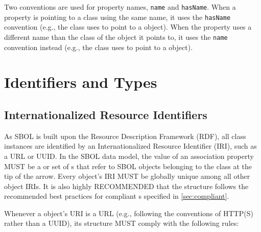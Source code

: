 Two conventions are used for property names, {\tt name} and {\tt hasName}.
When a property is pointing to a class using the same name, it uses the {\tt hasName} convention (e.g., the  class uses  to point to a  object).
When the property uses a different name than the class of the object it points to, it uses the {\tt name} convention instead (e.g., the  class uses  to point to a  object).


\section{Identifiers and Types}

\subsection{Internationalized Resource Identifiers}
\label{sec:IRIstructure}
\label{sec:identity}

As SBOL is built upon the Resource Description Framework (RDF), all class instances are identified by an Internationalized Resource Identifier (IRI), such as a URL or UUID.  
In the SBOL data model, the value of an association property MUST be a  or set of s that refer to SBOL objects belonging to the class at the tip of the arrow.  Every  object's IRI MUST be globally unique among all other  object IRIs. It is also highly RECOMMENDED that the  structure follows the recommended best practices for compliant s specified in \ref{sec:compliant}.

Whenever a  object's URI is a URL (e.g., following the conventions of HTTP(S) rather than a UUID), its structure MUST comply with the following rules:

